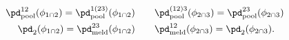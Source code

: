 \begin{align}
  \pd_{\text{pool}}^{12}(\phi_{1 \cap 2}) = \pd_{\text{pool}}^{1(23)}(\phi_{1 \cap 2}) \quad & \quad
  \pd_{\text{pool}}^{(12)3}(\phi_{2 \cap 3}) = \pd_{\text{pool}}^{23}(\phi_{2 \cap 3}) 
  \label{eqn:orig-melding-commutative-equalities-1}
  \\
  \pd_{2}(\phi_{1 \cap 2}) = \pd_{\text{meld}}^{23}(\phi_{1 \cap 2}) \quad & \quad
  \pd_{\text{meld}}^{12}(\phi_{2 \cap 3}) = \pd_{2}(\phi_{2 \cap 3}).
  \label{eqn:orig-melding-commutative-equalities-2}
\end{align}